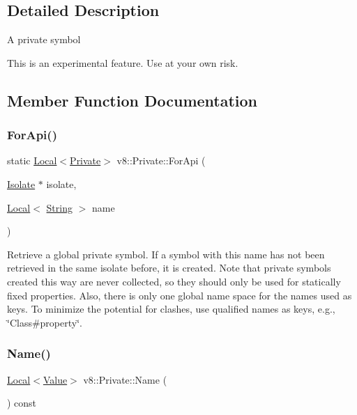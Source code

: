 \subsection{Detailed Description}
A private symbol

This is an experimental feature. Use at your own risk. 

\subsection{Member Function Documentation}
\mbox{\label{classv8_1_1Private_a0ab8628387166b8a8abc6e9b6f40ad55}} 
\subsubsection{\texorpdfstring{For\+Api()}{ForApi()}}
{\footnotesize\ttfamily static \mbox{\hyperlink{classv8_1_1Local}{Local}}$<$\mbox{\hyperlink{classv8_1_1Private}{Private}}$>$ v8\+::\+Private\+::\+For\+Api (\begin{DoxyParamCaption}\item[{\mbox{\hyperlink{classv8_1_1Isolate}{Isolate}} $\ast$}]{isolate,  }\item[{\mbox{\hyperlink{classv8_1_1Local}{Local}}$<$ \mbox{\hyperlink{classv8_1_1String}{String}} $>$}]{name }\end{DoxyParamCaption})\hspace{0.3cm}{\ttfamily [static]}}

Retrieve a global private symbol. If a symbol with this name has not been retrieved in the same isolate before, it is created. Note that private symbols created this way are never collected, so they should only be used for statically fixed properties. Also, there is only one global name space for the names used as keys. To minimize the potential for clashes, use qualified names as keys, e.\+g., \char`\"{}\+Class\#property\char`\"{}. \mbox{\label{classv8_1_1Private_ab3bbd6a2dcf6aea73f65c95f0d216f12}} 
\subsubsection{\texorpdfstring{Name()}{Name()}}
{\footnotesize\ttfamily \mbox{\hyperlink{classv8_1_1Local}{Local}}$<$\mbox{\hyperlink{classv8_1_1Value}{Value}}$>$ v8\+::\+Private\+::\+Name (\begin{DoxyParamCaption}{ }\end{DoxyParamCaption}) const}

